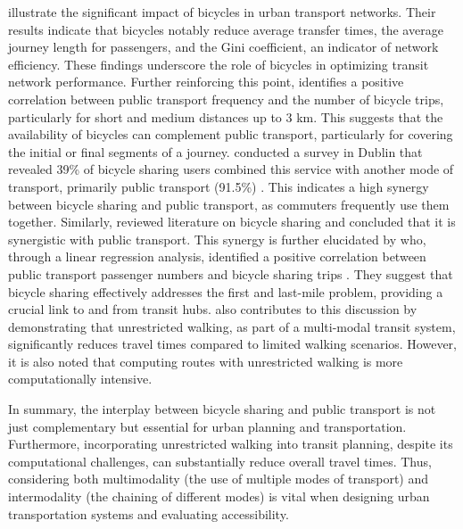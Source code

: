  illustrate the significant impact of bicycles in urban transport networks. 
Their results indicate that bicycles notably reduce average transfer times, the average journey length for passengers, and the Gini coefficient, an indicator of network efficiency. 
These findings underscore the role of bicycles in optimizing transit network performance.
Further reinforcing this point,  identifies a positive correlation between public transport frequency and the number of bicycle trips, particularly for short and medium distances up to 3 km. 
This suggests that the availability of bicycles can complement public transport, particularly for covering the initial or final segments of a journey.
 conducted a survey in Dublin that revealed 39\% of bicycle sharing users combined this service with another mode of transport, primarily public transport (91.5\%) . 
This indicates a high synergy between bicycle sharing and public transport, as commuters frequently use them together.
Similarly,  reviewed literature on bicycle sharing and concluded that it is synergistic with public transport.
This synergy is further elucidated by  who, through a linear regression analysis, identified a positive correlation between public transport passenger numbers and bicycle sharing trips . 
They suggest that bicycle sharing effectively addresses the first and last-mile problem, providing a crucial link to and from transit hubs.
 also contributes to this discussion by demonstrating that unrestricted walking, as part of a multi-modal transit system, significantly reduces travel times compared to limited walking scenarios.
However, it is also noted that computing routes with unrestricted walking is more computationally intensive.

In summary, the interplay between bicycle sharing and public transport is not just complementary but essential for urban planning and transportation.
Furthermore, incorporating unrestricted walking into transit planning, despite its computational challenges, can substantially reduce overall travel times.
Thus, considering both multimodality (the use of multiple modes of transport) and intermodality (the chaining of different modes) is vital when designing urban transportation systems and evaluating accessibility.
